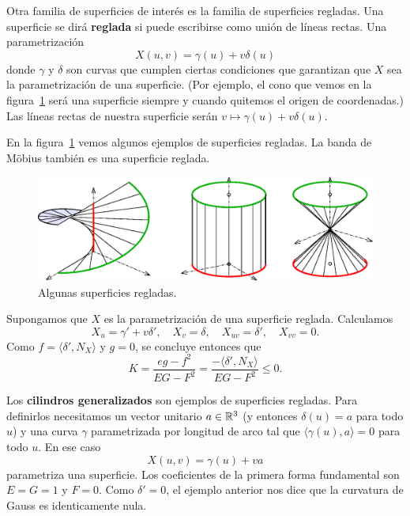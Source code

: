 \begin{example}
	Otra familia de superficies de interés es la familia de superficies
	regladas. Una superficie se dirá \textbf{reglada} si puede escribirse como
	unión de líneas rectas. Una parametrización
	\[
		X(u,v)=\gamma(u)+v\delta(u)
	\]
	donde $\gamma$ y $\delta$ son curvas que cumplen ciertas condiciones que
	garantizan que $X$ sea la parametrización de una superficie. (Por ejemplo,
	el cono que vemos en la figura~\ref{fig:reglada} será una superficie
	siempre y cuando quitemos el origen de coordenadas.) Las líneas rectas de
	nuestra superficie serán $v\mapsto \gamma(u)+v\delta(u)$. 

	En la figura~\ref{fig:reglada} vemos algunos ejemplos de superficies
	regladas. La banda de M\"obius también es una superficie reglada.
	\begin{figure}
		\centering
    	\includegraphics[scale=0.3]{eps/ruled}
		\caption{Algunas superficies regladas.}
		\label{fig:reglada}
	\end{figure}

	Supongamos que $X$ es la parametrización de una superficie reglada. 
	Calculamos
	\[
		X_u=\gamma'+v\delta',\quad
		X_v=\delta,\quad
		X_{uv}=\delta',\quad
		X_{vv}=0.
	\]
	Como $f=\langle \delta',N_X\rangle$ y $g=0$, se concluye entonces que 
	\[
		K=\frac{eg-f^2}{EG-F^2}=\frac{-\langle \delta',N_X\rangle}{EG-F^2}\leq 0.
	\]
\end{example}

\begin{example}
	Los \textbf{cilindros generalizados} son ejemplos de superficies regladas.
	Para definirlos necesitamos un vector unitario $a\in\mathbb{R}^3$ (y entonces
	$\delta(u)=a$ para todo $u$) y una curva $\gamma$ parametrizada por
	longitud de arco tal que $\langle\gamma(u),a\rangle=0$ para todo $u$. En
	ese caso 
	\[
		X(u,v)=\gamma(u)+va
	\]
	parametriza una superficie. Los coeficientes de la primera forma
	fundamental son $E=G=1$ y $F=0$. Como $\delta'=0$, el ejemplo anterior nos
	dice que la curvatura de Gauss es identicamente nula.
\end{example}

